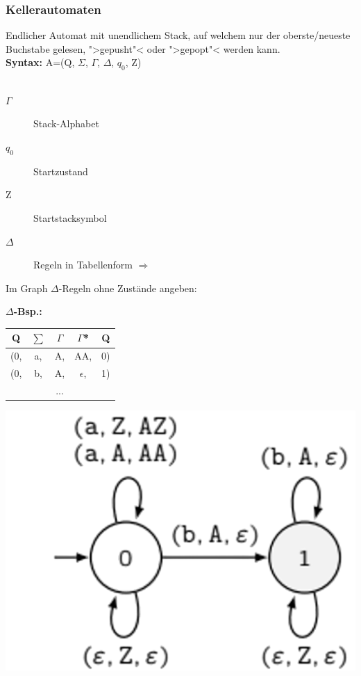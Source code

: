 \documentclass[12pt,a4paper]{article}
\begin{document}
	\subsubsection{Kellerautomaten}
	Endlicher Automat mit unendlichem Stack, auf welchem nur der oberste/neueste Buchstabe gelesen, ">gepusht"< oder ">gepopt"< werden kann.\\
	\textbf{Syntax:} A=(Q, $\Sigma$, $\Gamma$, $\Delta$, $q_0$, Z)\\\\
	\begin{minipage}[c]{0.5\textwidth}
		\begin{description}
			\item[$\Gamma$] Stack-Alphabet
			\item[$q_0$] Startzustand
			\item[Z] Startstacksymbol  
			\item[$\Delta$] Regeln in Tabellenform $\Rightarrow$
		\end{description}
		Im Graph $\Delta$-Regeln ohne Zustände angeben:
	\end{minipage}
	\begin{minipage}[c]{0.5\textwidth}
		$\Delta$\textbf{-Bsp.:}\\
		\begin{tabular}[h]{c|c|c|c|c}
			Q & $\sum$ & $\Gamma$ & $\Gamma$* & Q\\
			\hline
			(0, & a, & A, & AA, & 0)\\
			(0, & b, & A, & $\epsilon$, & 1)\\
			&&...
		\end{tabular}
		\includegraphics[scale=0.3]{Bilder/KellerAutomat.png}
	\end{minipage}
\end{document}

